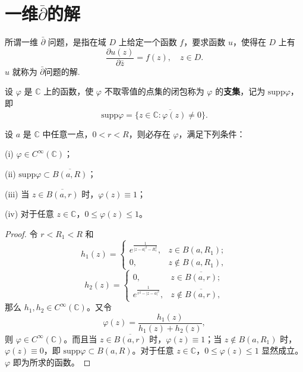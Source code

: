 \documentclass[../../main.tex]{subfiles}
\begin{document}
\section{一维$\overline{\partial }$的解}

\begin{definition}
所谓一维 \( \bar{\partial} \) 问题，是指在域 \( D \) 上给定一个函数 \( f \)，要求函数 \( u \)，使得在 \( D \) 上有
\[
\frac{\partial u(z)}{\partial \bar{z}} = f(z), \quad z \in D.
\]
\( u \) 就称为 \( \bar{\partial} \)问题的解.
\end{definition}

\begin{definition}
设 \( \varphi \) 是 \( \mathbb{C} \) 上的函数，使 \( \varphi \) 不取零值的点集的闭包称为 \( \varphi \) 的\textbf{支集}，记为 \( \text{supp}\varphi \)，即
\[
\text{supp}\varphi = \overline{\{ z \in \mathbb{C} : \varphi(z) \neq 0 \}}.
\]
\end{definition}

\begin{lemma}\label{lemma:引理3.7.2}
设 \( a \) 是 \( \mathbb{C} \) 中任意一点，\( 0 < r < R \)，则必存在 \( \varphi \)，满足下列条件：

(i) \( \varphi \in C^\infty(\mathbb{C}) \)；

(ii) \( \text{supp}\varphi \subset \overline{B(a,R)} \)；

(iii) 当 \( z \in \overline{B(a,r)} \) 时，\( \varphi(z) \equiv 1 \)；

(iv) 对于任意 \( z \in \mathbb{C} \)，\( 0 \leqslant \varphi(z) \leqslant 1 \)。
\end{lemma}
\begin{proof}
令 \( r < R_1 < R \) 和
\[
h_1(z) = \begin{cases} 
\displaystyle e^{\frac{1}{|z - a|^2 - R_1^2}}, & z \in B(a,R_1); \\
0, & z \notin B(a,R_1),
\end{cases}
\]
\[
h_2(z) = \begin{cases} 
0, & z \in \overline{B(a,r)}; \\
\displaystyle e^{\frac{1}{r^2 - |z - a|^2}}, & z \notin \overline{B(a,r)},
\end{cases}
\]
那么 \( h_1, h_2 \in C^\infty(\mathbb{C}) \)。又令
\[
\varphi(z) = \frac{h_1(z)}{h_1(z) + h_2(z)},
\]
则 \( \varphi \in C^\infty(\mathbb{C}) \)。而且当 \( z \in \overline{B(a,r)} \) 时，\( \varphi(z) \equiv 1 \)；当 \( z \notin B(a,R_1) \) 时，\( \varphi(z) \equiv 0 \)，即 \( \text{supp}\varphi \subset B(a,R) \)。对于任意 \( z \in \mathbb{C} \)，\( 0 \leqslant \varphi(z) \leqslant 1 \) 显然成立。\( \varphi \) 即为所求的函数。
\end{proof}
\end{document}
